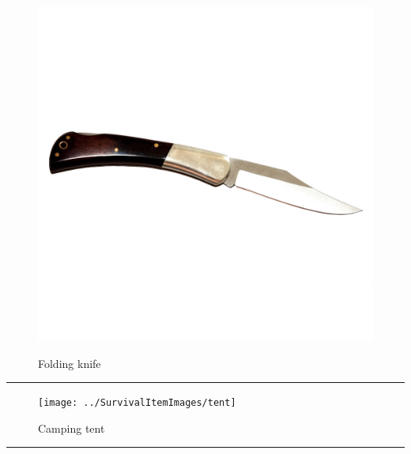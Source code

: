 \documentclass{article}
\begin{document}
    \begin{figure}[H]
        \centering
        \begin{minipage}{0.25\textwidth}
            \centering
            \includegraphics[width=\textwidth]{../SurvivalItemImages/knife}
        \end{minipage}\hfill
        \begin{minipage}{0.7\textwidth}
            \centering
            \Large Folding knife
        \end{minipage}
    \end{figure}
    \vspace{-0.8em}
    \noindent\rule{\textwidth}{0.4pt}
            
    \begin{figure}[H]
        \centering
        \begin{minipage}{0.25\textwidth}
            \centering
            \texttt{[image: ../SurvivalItemImages/tent]}
        \end{minipage}\hfill
        \begin{minipage}{0.7\textwidth}
            \centering
            \Large Camping tent
        \end{minipage}
    \end{figure}
    \vspace{-0.8em}
    \noindent\rule{\textwidth}{0.4pt}
            
\end{document}
